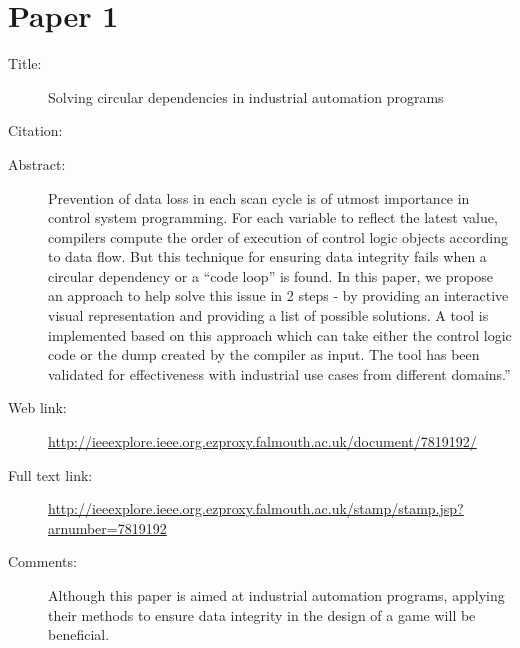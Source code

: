 \documentclass{scrartcl}
\begin{document}
\section*{Paper 1}
\begin{description}
\item[Title:] Solving circular dependencies in industrial automation programs
\item[Citation:] \cite{nair2016solving}
\item[Abstract:] Prevention of data loss in each scan cycle is of utmost importance in control system programming. For each variable to reflect the latest value, compilers compute the order of execution of control logic objects according to data flow. But this technique for ensuring data integrity fails when a circular dependency or a “code loop” is found. In this paper, we propose an approach to help solve this issue in 2 steps - by providing an interactive visual representation and providing a list of possible solutions. A tool is implemented based on this approach which can take either the control logic code or the dump created by the compiler as input. The tool has been validated for effectiveness with industrial use cases from different domains.''
\item[Web link:] \url{http://ieeexplore.ieee.org.ezproxy.falmouth.ac.uk/document/7819192/}
\item[Full text link:] \url{http://ieeexplore.ieee.org.ezproxy.falmouth.ac.uk/stamp/stamp.jsp?arnumber=7819192}
\item[Comments:] Although this paper is aimed at industrial automation programs, applying their methods to ensure data integrity in the design of a game will be beneficial.
\end{description}
\end{document}
